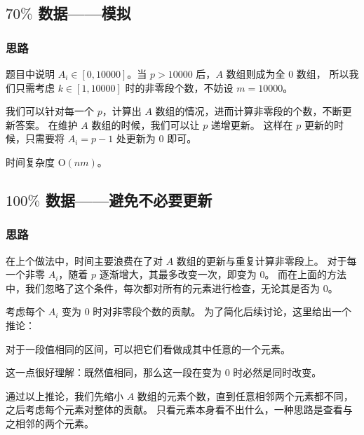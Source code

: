
% 

\subsection{\texorpdfstring{$70\%$}{70\%} 数据——模拟}

\subsubsection{思路}

题目中说明 $A_i\in[0, 10000]$。当 $p>10000$ 后，$A$ 数组则成为全 $0$ 数组，
所以我们只需考虑 $k\in[1, 10000]$ 时的非零段个数，不妨设 $m=10000$。

我们可以针对每一个 $p$，计算出 $A$ 数组的情况，进而计算非零段的个数，不断更新答案。
在维护 $A$ 数组的时候，我们可以让 $p$ 递增更新。
这样在 $p$ 更新的时候，只需要将 $A_i=p-1$ 处更新为 $0$ 即可。

时间复杂度 $\mathrm{O}(nm)$。

\subsection{\texorpdfstring{$100\%$}{100\%} 数据——避免不必要更新}

\subsubsection{思路}

在上个做法中，时间主要浪费在了对 $A$ 数组的更新与重复计算非零段上。
对于每一个非零 $A_i$，随着 $p$ 逐渐增大，其最多改变一次，即变为 $0$。
而在上面的方法中，我们忽略了这个条件，每次都对所有的元素进行检查，无论其是否为 $0$。

考虑每个 $A_i$ 变为 $0$ 时对非零段个数的贡献。
为了简化后续讨论，这里给出一个推论：

\begin{corollary}[相邻相等元素与单个元素等价] \label{cor:adjacent-same-element-equals-one-element}
    对于一段值相同的区间，可以把它们看做成其中任意的一个元素。

    这一点很好理解：既然值相同，那么这一段在变为 $0$ 时必然是同时改变。
\end{corollary}

通过以上推论，我们先缩小 $A$ 数组的元素个数，直到任意相邻两个元素都不同，之后考虑每个元素对整体的贡献。
只看元素本身看不出什么，一种思路是查看与之相邻的两个元素。

